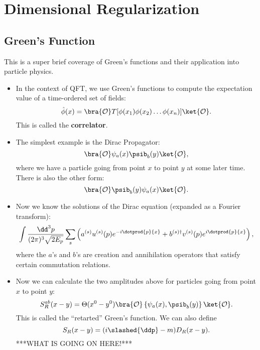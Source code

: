 \section*{Dimensional Regularization}

\subsection*{Green's Function}
This is a super brief coverage of Green's functions and their application into particle physics.

\begin{itemize}
    \item In the context of QFT, we use Green's functions to compute the expectation value of a time-ordered set of fields:
        \begin{equation}
            \hat{\phi}(x) = \bra{\mathcal{O}} T[\phi(x_1)\phi(x_2)\ldots\phi(x_n)] \ket{\mathcal{O}}.
        \end{equation}
        This is called the \textbf{correlator}.
    \item The simplest example is the Dirac Propagator:
        \begin{equation*}
            \bra{\mathcal{O}} \psi_a(x) \psib_b(y) \ket{\mathcal{O}},
        \end{equation*}
        where we have a particle going from point $x$ to point $y$ at some later time. There is also the other form:
        \begin{equation*}
            \bra{\mathcal{O}} \psib_b(y) \psi_a(x) \ket{\mathcal{O}}.
        \end{equation*}
    \item Now we know the solutions of the Dirac equation (expanded as a Fourier transform):
        \begin{equation*}
            \int \frac{\dd^3p}{(2\pi)^3 \sqrt{2E_p}} \sum_s \left(a^{(s)}u^{(s)}(p) e^{-i\dotprod{p}{x}} + b^{(s)\dagger}v^{(s)}(p)e^{i\dotprod{p}{x}}\right),
        \end{equation*}
        where the $a$'s and $b$'s are creation and annihilation operators that satisfy certain commutation relations.
    \item Now we can calculate the two amplitudes above for particles going from point $x$ to point $y$:
        \begin{equation}
            S_R^{ab}(x-y) = \Theta(x^0 - y^0) \bra{\mathcal{O}} \left\{ \psi_a(x), \psib_b(y) \right\} \ket{\mathcal{O}}.
        \end{equation}
        This is called the ``retarted'' Green's function. We can also define
        \begin{equation}
            S_R(x-y) = (i\slashed{\ddp} - m)D_R(x-y).
        \end{equation}
        ***WHAT IS GOING ON HERE!***
\end{itemize}



